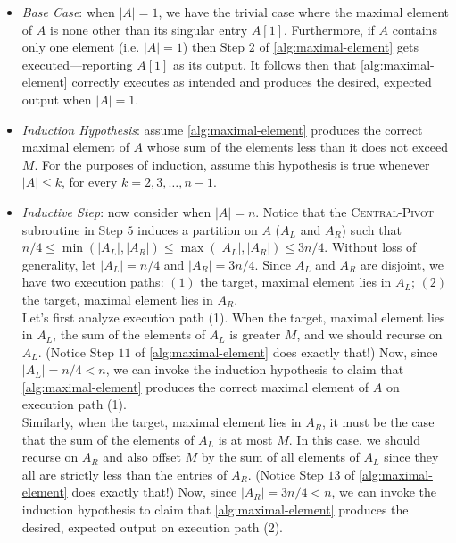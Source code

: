 \documentclass[10pt, letterpaper]{article}
\begin{document}
\begin{enumerate}[label={\bfseries Q\arabic*.}]
\begin{enumerate}
        \begin{itemize}[itemsep=10pt]
          \item
            {\itshape Base Case}: when $|A| = 1$, we have the trivial case where the maximal element of
            $A$ is none other than its singular entry $A[1]$. Furthermore, if $A$ contains only one element
            (i.e. $|A| = 1$) then Step $2$ of \autoref{alg:maximal-element} gets executed---reporting $A[1]$
            as its output. It follows then that \autoref{alg:maximal-element} correctly executes as intended
            and produces the desired, expected output when $|A| = 1$.

          \item
            {\itshape Induction Hypothesis}: assume \autoref{alg:maximal-element} produces the correct maximal
            element of $A$ whose sum of the elements less than it does not exceed $M$. For the purposes of
            induction, assume this hypothesis is true whenever $|A| \leq k$, for every $k = 2, 3, \ldots, n-1$.

          \item
            {\itshape Inductive Step}: now consider when $|A| = n$. Notice that the \textsc{Central-Pivot}
            subroutine in Step $5$ induces a partition on $A$ ($A_L$ and $A_R$) such that $n/4 \leq \min(|A_L|,
            |A_R|) \leq \max(|A_L|, |A_R|) \leq 3n/4$. Without loss of generality, let $|A_L| = n/4$ and $|A_R|
            = 3n/4$. Since $A_L$ and $A_R$ are disjoint, we have two execution paths: $(1)$ the target, maximal
            element lies in $A_L$; $(2)$ the target, maximal element lies in $A_R$. \\

            Let's first analyze execution path (1). When the target, maximal element lies in $A_L$, the sum of
            the elements of $A_L$ is greater $M$, and we should recurse on $A_L$. (Notice Step $11$ of
            \autoref{alg:maximal-element} does exactly that!) Now, since $|A_L| = n/4 < n$, we can invoke the
            induction hypothesis to claim that \autoref{alg:maximal-element} produces the correct maximal element
            of $A$ on execution path (1). \\

            Similarly, when the target, maximal element lies in $A_R$, it must be the case that the sum of the
            elements of $A_L$ is at most $M$. In this case, we should recurse on $A_R$ and also offset $M$ by the
            sum of all elements of $A_L$ since they all are strictly less than the entries of $A_R$. (Notice Step
            $13$ of \autoref{alg:maximal-element} does exactly that!) Now, since $|A_R| = 3n/4 < n$, we can invoke
            the induction hypothesis to claim that \autoref{alg:maximal-element} produces the desired, expected
            output on execution path (2). \\


\end{itemize}
\end{enumerate}
\end{enumerate}
\end{document}

